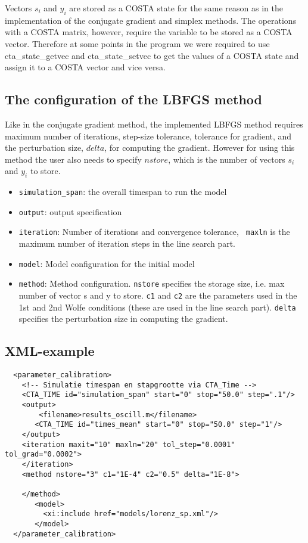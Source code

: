 Vectors $s_i$ and $y_i$ are stored as a COSTA state for the same reason as in
the implementation of the conjugate gradient and simplex methods. The
operations with a COSTA matrix, however, require the variable to be stored as a 
COSTA vector. Therefore at some points in the program we were required to
use cta\_state\_getvec and cta\_state\_setvec to get the values of a COSTA
state and assign it to a COSTA vector and vice versa.

\subsection{The configuration of the LBFGS method}

Like in the conjugate gradient method, the implemented LBFGS method
requires maximum number of iterations, step-size tolerance, tolerance for
gradient, and the perturbation size, $delta$, for computing the gradient.
However for using this method the user also needs to specify $nstore$,
which is the number of vectors $s_i$ and $y_i$ to store.

\begin{itemize}
\item {\tt simulation\_span}: the overall timespan to run the model
\item {\tt output}: output specification
\item {\tt iteration}: Number of iterations and convergence tolerance, {\tt
  maxln} is the maximum number of iteration steps in the line search part.
\item {\tt model}: Model configuration for the initial model
\item {\tt method}: Method configuration.
    {\tt nstore} specifies the storage size, i.e. max number of vector s and y to store.
    {\tt c1} and {\tt c2} are the parameters used in the 1st and 2nd Wolfe
    conditions (these are used in the line search part). 
    {\tt delta} specifies the perturbation size in computing the gradient.
\end{itemize}


\subsection{XML-example}
\begin{verbatim}
  <parameter_calibration>
    <!-- Simulatie timespan en stapgrootte via CTA_Time -->
    <CTA_TIME id="simulation_span" start="0" stop="50.0" step=".1"/>
    <output>
        <filename>results_oscill.m</filename> 
       <CTA_TIME id="times_mean" start="0" stop="50.0" step="1"/>
    </output>
    <iteration maxit="10" maxln="20" tol_step="0.0001" tol_grad="0.0002">
    </iteration>
    <method nstore="3" c1="1E-4" c2="0.5" delta="1E-8">

    </method>
       <model>
         <xi:include href="models/lorenz_sp.xml"/>
       </model>
  </parameter_calibration>
\end{verbatim}

